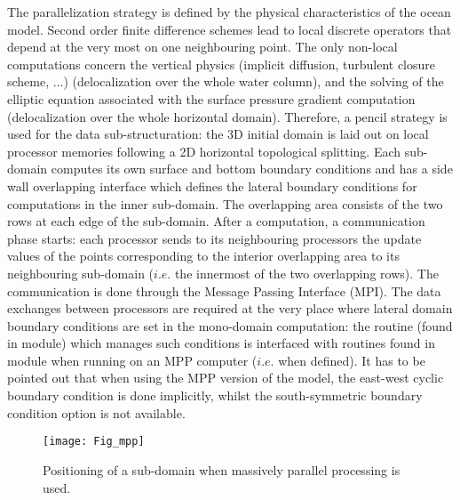 \documentclass[../main/NEMO_manual]{subfiles}
\begin{document}
The parallelization strategy is defined by the physical characteristics of the ocean model.
Second order finite difference schemes lead to local discrete operators that
depend at the very most on one neighbouring point.
The only non-local computations concern the vertical physics
(implicit diffusion, turbulent closure scheme, ...) (delocalization over the whole water column),
and the solving of the elliptic equation associated with the surface pressure gradient computation
(delocalization over the whole horizontal domain).
Therefore, a pencil strategy is used for the data sub-structuration:
the 3D initial domain is laid out on local processor memories following a 2D horizontal topological splitting.
Each sub-domain computes its own surface and bottom boundary conditions and
has a side wall overlapping interface which defines the lateral boundary conditions for
computations in the inner sub-domain.
The overlapping area consists of the two rows at each edge of the sub-domain.
After a computation, a communication phase starts:
each processor sends to its neighbouring processors the update values of the points corresponding to
the interior overlapping area to its neighbouring sub-domain ($i.e.$ the innermost of the two overlapping rows).
The communication is done through the Message Passing Interface (MPI).
The data exchanges between processors are required at the very place where
lateral domain boundary conditions are set in the mono-domain computation:
the  routine (found in  module) which manages such conditions is interfaced with
routines found in  module when running on an MPP computer ($i.e.$ when  defined).
It has to be pointed out that when using the MPP version of the model,
the east-west cyclic boundary condition is done implicitly,
whilst the south-symmetric boundary condition option is not available.

\begin{figure}[!t]
  \begin{center}
    \texttt{[image: Fig\_mpp]}
    \caption{
      \protect\label{fig:mpp}
      Positioning of a sub-domain when massively parallel processing is used.
    }
  \end{center}
\end{figure}
\end{document}
